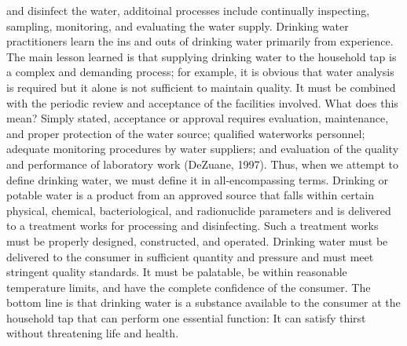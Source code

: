 \documentclass{article}
\begin{document}
and disinfect the water, additoinal processes include continually
inspecting, sampling, monitoring, and evaluating the water supply.
Drinking water practitioners learn the ins and outs of drinking water
primarily from experience. The main lesson learned is that supplying
drinking water to the household tap is a complex and demanding process;
for example, it is obvious that water analysis is required but it alone
is not sufficient to maintain quality. It must be combined with the
periodic review and acceptance of the facilities involved. What does
this mean? Simply stated, acceptance or approval requires evaluation,
maintenance, and proper protection of the water source; qualified
waterworks personnel; adequate monitoring procedures by water suppliers;
and evaluation of the quality and performance of laboratory work
(DeZuane, 1997). Thus, when we attempt to define drinking water, we must
define it in all-encompassing terms. Drinking or potable water is a
product from an approved source that falls within certain physical,
chemical, bacteriological, and radionuclide parameters and is delivered
to a treatment works for processing and disinfecting. Such a treatment
works must be properly designed, constructed, and operated. Drinking
water must be delivered to the consumer in sufficient quantity and
pressure and must meet stringent quality standards. It must be
palatable, be within reasonable temperature limits, and have the
complete confidence of the consumer. The bottom line is that drinking
water is a substance available to the consumer at the household tap that
can perform one essential function: It can satisfy thirst without
threatening life and health.
\end{document}
